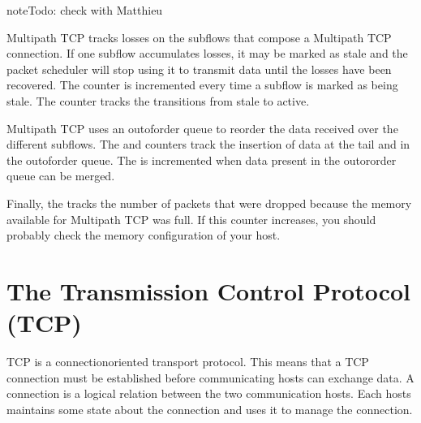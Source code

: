 \documentclass[letterpaper,10pt,english]{sphinxmanual}
\begin{document}
\begin{sphinxadmonition}{note}{\label{\detokenize{nstat-mptcp:id5}}Todo:}
\sphinxAtStartPar
check with Matthieu
\end{sphinxadmonition}

\sphinxAtStartPar
Multipath TCP tracks losses on the subflows that compose a Multipath
TCP connection. If one subflow accumulates losses, it may be marked
as stale and the packet scheduler will stop using it to transmit data
until the losses have been recovered. The  counter is
incremented every time a subflow is marked as being stale. The
 counter tracks the transitions from stale to
active.

\sphinxAtStartPar
Multipath TCP uses an out\sphinxhyphen{}of\sphinxhyphen{}order queue to reorder the data received over
the different subflows. The  and    counters track the insertion of data at the tail and in the out\sphinxhyphen{}of\sphinxhyphen{}order
queue. The  is incremented when data present in the
out\sphinxhyphen{}or\sphinxhyphen{}order queue can be merged.

\sphinxAtStartPar
Finally, the  tracks the number of packets that
were dropped because the memory available for Multipath TCP was full.
If this counter increases, you should probably check the memory configuration
of your host.


\chapter{The Transmission Control Protocol (TCP)}
\label{\detokenize{tcp:the-transmission-control-protocol-tcp}}\label{\detokenize{tcp:chapter-tcp}}\label{\detokenize{tcp::doc}}
\sphinxAtStartPar
TCP is a connection\sphinxhyphen{}oriented transport protocol. This means that a TCP connection must be established before communicating hosts can exchange data. A connection is a logical relation between the two communication hosts. Each hosts maintains some state about the connection and uses it to manage the connection.
\end{document}
